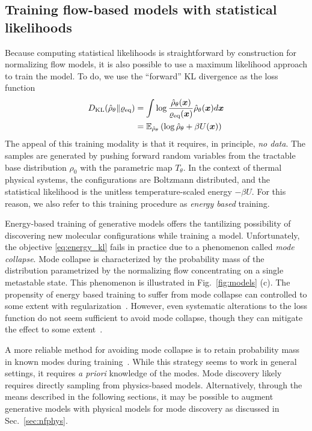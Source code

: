 \documentclass[11pt]{article}
\begin{document}
\subsection{Training flow-based models with statistical likelihoods} \label{sec:nfs}

Because computing statistical likelihoods is straightforward by construction for normalizing flow models, it is also possible to use a maximum likelihood approach to train the model. 
To do, we use the ``forward'' KL divergence as the loss function
\begin{equation}
\begin{aligned}
    D_{\rm KL}(\hat\rho_{\theta} \| \varrho_{\rm eq}) &= \int \log \frac{\hat\rho_{\theta}(\boldsymbol{x})}{\varrho_{\rm eq}(\boldsymbol{x})} \hat\rho_{\theta}(\boldsymbol{x}) d\boldsymbol{x} \\
    &= \mathbb{E}_{\hat\rho_\theta} \left( \log \hat\rho_{\theta} + \beta U(\boldsymbol{x}) \right)
    \label{eq:energy_kl}
\end{aligned}
\end{equation}
The appeal of this training modality is that it requires, in principle, \emph{no data}.
The samples are generated by pushing forward random variables from the tractable base distribution $\rho_0$ with the parametric map $T_{\theta}$.
In the context of thermal physical systems, the configurations are Boltzmann distributed, and the statistical likelihood is the unitless temperature-scaled energy $-\beta U.$
For this reason, we also refer to this training procedure as \textit{energy based} training.

Energy-based training of generative models offers the tantilizing possibility of discovering new molecular configurations while training a model. 
Unfortunately, the objective \eqref{eq:energy_kl} fails in practice due to a phenomenon called \textit{mode collapse}. 
Mode collapse is characterized by the probability mass of the distribution parametrized by the normalizing flow concentrating on a single metastable state.
This phenomenon is illustrated in Fig.~\ref{fig:models} (c).
The propensity of energy based training to suffer from mode collapse can controlled to some extent with regularization~\cite{del_debbio_efficient_2021}.
However, even systematic alterations to the loss function do not seem sufficient to avoid mode collapse, though they can mitigate the effect to some extent~\cite{felardos_designing_2023}.

A more reliable method for avoiding mode collapse is to retain probability mass in known modes during training~\cite{gabrie_adaptive_2022}.
While this strategy seems to work in general settings, it requires \emph{a priori} knowledge of the modes.
Mode discovery likely requires directly sampling from physics-based models.
Alternatively, through the means described in the following sections, it may be possible to augment generative models with physical models for mode discovery as discussed in Sec.~\ref{sec:nfphys}. 
\end{document}
